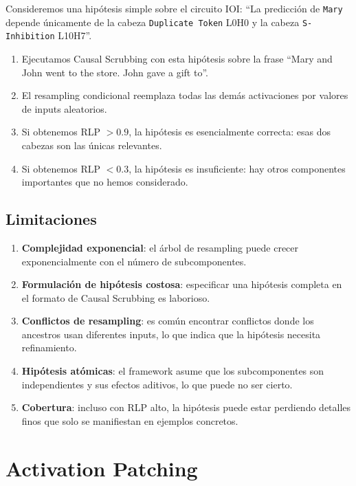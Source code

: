 \documentclass[11pt,a4paper]{report}
\theoremstyle{definition}
\begin{document}
Consideremos una hipótesis simple sobre el circuito IOI: ``La predicción de \texttt{Mary} depende únicamente de la cabeza \texttt{Duplicate Token} L0H0 y la cabeza \texttt{S-Inhibition} L10H7''.

\begin{enumerate}
    \item Ejecutamos Causal Scrubbing con esta hipótesis sobre la frase ``Mary and John went to the store. John gave a gift to''.
    \item El resampling condicional reemplaza todas las demás activaciones por valores de inputs aleatorios.
    \item Si obtenemos RLP $> 0.9$, la hipótesis es esencialmente correcta: esas dos cabezas son las únicas relevantes.
    \item Si obtenemos RLP $< 0.3$, la hipótesis es insuficiente: hay otros componentes importantes que no hemos considerado.
\end{enumerate}

\section{Limitaciones}

\begin{enumerate}
    \item \textbf{Complejidad exponencial}: el árbol de resampling puede crecer exponencialmente con el número de subcomponentes.
    \item \textbf{Formulación de hipótesis costosa}: especificar una hipótesis completa en el formato de Causal Scrubbing es laborioso.
    \item \textbf{Conflictos de resampling}: es común encontrar conflictos donde los ancestros usan diferentes inputs, lo que indica que la hipótesis necesita refinamiento.
    \item \textbf{Hipótesis atómicas}: el framework asume que los subcomponentes son independientes y sus efectos aditivos, lo que puede no ser cierto.
    \item \textbf{Cobertura}: incluso con RLP alto, la hipótesis puede estar perdiendo detalles finos que solo se manifiestan en ejemplos concretos.
\end{enumerate}

\newpage

\chapter{Activation Patching}
\label{ch:activation-patching}
\end{document}
